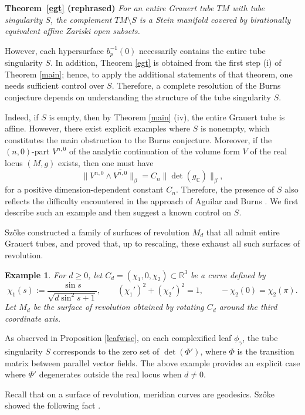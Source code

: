 \documentclass[a4paper, 12pt]{article}
\newcommand{\bR}{\mathbb{R}}
\newcommand{\gC}{g_{\mathbb{C}}}
\newtheorem{exmp}[thm]{Example}
\begin{document}
\medskip
\noindent\textbf{Theorem~\ref{egt} (rephrased)}
\textit{For an entire Grauert tube $TM$ with tube singularity $S$, the complement $TM\setminus S$ is a Stein manifold covered by birationally equivalent affine Zariski open subsets.}\medskip

However, each hypersurface $b_p^{-1}(0)$ necessarily contains the entire tube singularity $S$. In addition, Theorem \ref{egt} is obtained from the first step (i) of Theorem \ref{main}; hence, to apply the additional statements of that theorem, one needs sufficient control over $S$. Therefore, a complete resolution of the Burns conjecture depends on understanding the structure of the tube singularity $S$.

Indeed, if $S$ is empty, then by Theorem \ref{main} (iv), the entire Grauert tube is affine. However, there exist explicit examples where $S$ is nonempty, which constitutes the main obstruction to the Burns conjecture. Moreover, if the $(n,0)$-part $V^{n,0}$ of the analytic continuation of the volume form $V$ of the real locus $(M,g)$ exists, then one must have
\[
\|V^{n,0} \wedge \overline{V^{n,0}}\|_\beta = C_n\|\det(\gC)\|_\beta,
\]
for a positive dimension-dependent constant $C_n$. Therefore, the presence of $S$ also reflects the difficulty encountered in the approach of Aguilar and Burns \cite{AB00}. We first describe such an example and then suggest a known control on $S$.

Sz\H oke \cite[Section 4]{S91} constructed a family of surfaces of revolution $M_d$ that all admit entire Grauert tubes, and proved that, up to rescaling, these exhaust all such surfaces of revolution.

\begin{exmp}
For $d\geq 0$, let $C_d = (\chi_1,0,\chi_2) \subset \bR^3$ be a curve defined by
\[
\chi_1(s) := \frac{\sin s}{\sqrt{d \sin^2 s + 1}}, \qquad (\chi_1')^2 + (\chi_2')^2 = 1, \qquad -\chi_2(0) = \chi_2(\pi).
\]
Let $M_d$ be the surface of revolution obtained by rotating $C_d$ around the third coordinate axis.
\end{exmp}

As observed in Proposition \ref{leafwise}, on each complexified leaf $\phi_\gamma$, the tube singularity $S$ corresponds to the zero set of $\det(\Phi')$, where $\Phi$ is the transition matrix between parallel vector fields. The above example provides an explicit case where $\Phi'$ degenerates outside the real locus when $d \neq 0$.

Recall that on a surface of revolution, meridian curves are geodesics. Sz\H oke showed the following fact \cite[Proposition 4.2]{S91}.
\end{document}

